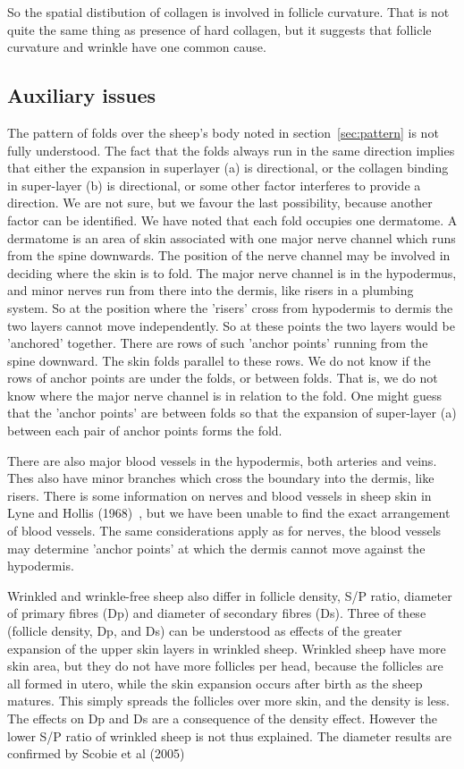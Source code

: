\documentclass[titlepage]{article}  %
\begin{document}
So the spatial distibution of collagen is involved in follicle curvature. That is not quite the same thing as presence of hard collagen, but it suggests that follicle curvature and wrinkle have one common cause.

\subsection{Auxiliary issues}
 The pattern of folds over the sheep's body noted in section~\ref{sec:pattern} is not fully understood. The fact that the folds always run in the same direction implies that either the expansion in superlayer (a) is directional, or the collagen binding in super-layer (b) is directional, or some other factor interferes to provide a direction. We are not sure, but we favour the last possibility, because another factor can be identified. We have noted that each fold occupies one dermatome. A dermatome is an area of skin associated with one major nerve channel which runs from the spine downwards. The position of the nerve channel may be involved in deciding where the skin is to fold. The major nerve channel is in the hypodermus, and minor nerves run from there into the dermis, like risers in a plumbing system. So at the position where the 'risers' cross from hypodermis to dermis the two layers cannot move independently. So at these points the two layers would be 'anchored' together. There are rows of such 'anchor points' running from the spine downward. The skin folds parallel to these rows. We do not know if the rows of anchor points are under the folds, or between folds. That is, we do not know where the major nerve channel is in relation to the fold. One might guess that the 'anchor points' are between folds so that the expansion of super-layer (a) between each pair of anchor points forms the fold.

There are also major blood vessels in the hypodermis, both arteries and veins. Thes also have minor branches which cross the boundary into the dermis, like risers.   There is some information on nerves and blood vessels in sheep skin in Lyne and Hollis (1968)~\cite{lyne:68}, but we have been unable to find the exact arrangement of blood vessels. The same  considerations apply as for nerves, the blood vessels may determine 'anchor points' at which the dermis cannot move against the hypodermis.

Wrinkled and wrinkle-free sheep also differ in follicle density, S/P ratio, diameter of primary fibres (Dp) and diameter of secondary fibres (Ds). Three of these (follicle density, Dp, and Ds) can be understood as effects of the greater expansion of the upper skin layers in wrinkled sheep. Wrinkled sheep have more skin area, but they do not have more follicles per head, because the follicles are all formed in utero, while the skin expansion occurs after birth as the sheep matures. This simply spreads the follicles over more skin, and the density is less. The effects on Dp and Ds are a consequence of the density effect.  However the lower S/P ratio of wrinkled sheep is not thus explained.  The diameter results are confirmed by Scobie et al (2005)~\cite{scob:05}
\end{document}
